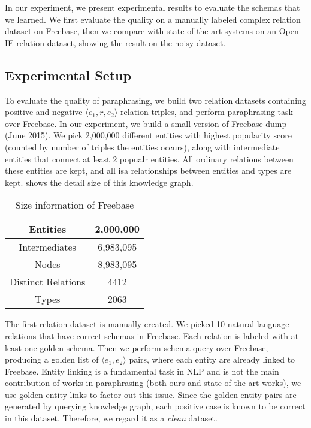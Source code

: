 In our experiment, we present experimental results to evaluate the schemas
that we learned. We first evaluate the quality on a manually labeled
complex relation dataset on Freebase, then we compare with state-of-the-art systems
on an Open IE relation dataset, showing the result on the noisy dataset.




\subsection{Experimental Setup}
To evaluate the quality of paraphrasing, we build two relation datasets containing 
positive and negative $\langle e_1, r, e_2 \rangle$ relation triples, and perform
paraphrasing task over Freebase.
In our experiment, we build a small version of Freebase dump (June 2015).
We pick 2,000,000 different entities with highest popularity score (counted by
number of triples the entities occurs), along with intermediate entities that
connect at least 2 popualr entities. All ordinary relations between these entities
are kept, and all isa relationships between entities and types are kept.
 shows the detail size of this knowledge graph.

\begin{table}[ht]
	\centering
	\caption{Size information of Freebase}
	\begin{tabular}{|c|c|}
        \hline
		Entities	 & 2,000,000 \\
        \hline
        Intermediates	 & 6,983,095 \\
		\hline
		Nodes & 8,983,095 \\
		\hline
		Distinct Relations & 4412 \\
        \hline
		Types & 2063 \\
		\hline
	\end{tabular}%
	\label{tab:fb-size}%
\end{table}


The first relation dataset is manually created. We picked 10 natural language relations
that have correct schemas in Freebase. Each relation is labeled with at least one
golden schema. Then we perform schema query over Freebase, producing a golden
list of $\langle e_1, e_2 \rangle$ pairs, where each entity are already linked to Freebase.
Entity linking is a fundamental task in NLP and is not the main contribution of works
in paraphrasing (both ours and state-of-the-art works), we use golden entity links 
to factor out this issue. Since the golden entity pairs are generated by querying
knowledge graph, each positive case is known to be correct in this dataset.
Therefore, we regard it as a \textit{clean} dataset.

